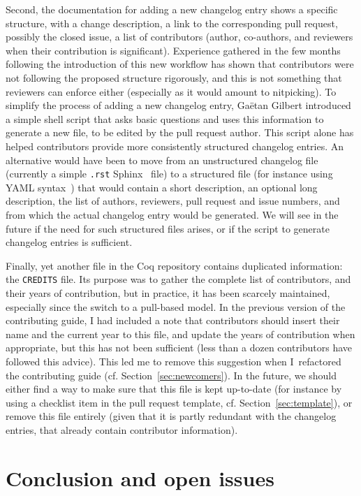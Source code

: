 Second, the documentation for adding a new changelog entry shows a specific structure, with a change description, a link to the corresponding pull request, possibly the closed issue, a list of contributors (author, co-authors, and reviewers when their contribution is significant).
Experience gathered in the few months following the introduction of this new workflow has shown that contributors were not following the proposed structure rigorously, and this is not something that reviewers can enforce either (especially as it would amount to nitpicking).
To simplify the process of adding a new changelog entry, Ga\"etan Gilbert introduced a simple shell script that asks basic questions and uses this information to generate a new file, to be edited by the pull request author.
This script alone has helped contributors provide more consistently structured changelog entries.
An alternative would have been to move from an unstructured changelog file (currently a simple \verb|.rst| Sphinx~\cite{sphinx} file) to a structured file (for instance using YAML syntax~\cite{benkiki2009yaml}) that would contain a short description, an optional long description, the list of authors, reviewers, pull request and issue numbers, and from which the actual changelog entry would be generated.
We will see in the future if the need for such structured files arises, or if the script to generate changelog entries is sufficient.

Finally, yet another file in the Coq repository contains duplicated information: the \verb|CREDITS| file.
Its purpose was to gather the complete list of contributors, and their years of contribution, but in practice, it has been scarcely maintained, especially since the switch to a pull-based model.
In the previous version of the contributing guide, I had included a note that contributors should insert their name and the current year to this file, and update the years of contribution when appropriate, but this has not been sufficient (less than a dozen contributors have followed this advice).
This led me to remove this suggestion when I refactored the contributing guide (cf. Section~\ref{sec:newcomers}).
In the future, we should either find a way to make sure that this file is kept up-to-date (for instance by using a checklist item in the pull request template, cf. Section~\ref{sec:template}), or remove this file entirely (given that it is partly redundant with the changelog entries, that already contain contributor information).

\section{Conclusion and open issues}

